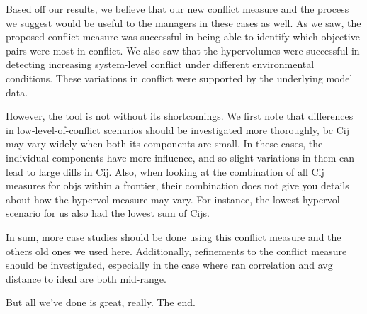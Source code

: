 Based off our results, we believe that our new conflict measure and the process we suggest would be useful to the managers in these cases as well. As we saw, the proposed conflict measure was successful in being able to identify which objective pairs were most in conflict. We also saw that the hypervolumes were successful in detecting increasing system-level conflict under different environmental conditions. These variations in conflict were supported by the underlying model data. 

However, the tool is not without its shortcomings. We first note that differences in low-level-of-conflict scenarios should be investigated more thoroughly, bc Cij may vary widely when both its components are small. In these cases, the individual components have more influence, and so slight variations in them can lead to large diffs in Cij. Also, when looking at the combination of all Cij measures for objs within a frontier, their combination does not give you details about how the hypervol measure may vary. For instance, the lowest hypervol scenario for us also had the lowest sum of Cijs.

In sum, more case studies should be done using this conflict measure and the others old ones we used here. Additionally, refinements to the conflict measure should be investigated, especially in the case where ran correlation and avg distance to ideal are both mid-range.

But all we've done is great, really. The end.